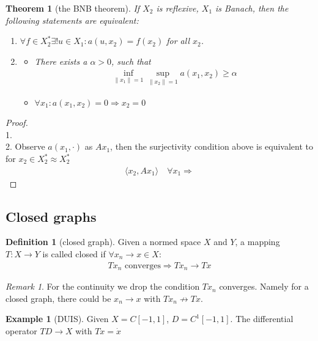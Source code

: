 \documentclass[a4paper,11pt,fleqn]{book}
\newtheorem{theorem}{Theorem}[section]
\theoremstyle{definition}
\newtheorem{definition}{Definition}[section]
\newtheorem*{example}{Example}
\theoremstyle{remark}
\newtheorem*{remark}{Remark}
\begin{document}
\begin{theorem}[the BNB theorem]
	If $X_2$ is reflexive, $X_1$ is Banach, then the following statements are equivalent:
	\begin{enumerate}
		\item $\forall f \in X^*_2 \exists ! u \in X_1: a(u, x_2) = f(x_2)$ for all $x_2$. 
		\item \begin{itemize}
			\item There exists a $\alpha > 0$, such that
			\begin{align*}
				\inf_{\|x_1\| = 1} \sup_{\|x_2\| = 1} a(x_1, x_2) \ge \alpha
			\end{align*}
			\item $\forall x_1: a(x_1, x_2) = 0 \Rightarrow x_2 = 0$
		\end{itemize}
	\end{enumerate}
\end{theorem}
\begin{proof}\quad\\
1. \\
2. Observe $a(x_1,  \cdot)$ as $Ax_1$, then the surjectivity condition above is equivalent to for $x_2 \in X_2^* \approx X_2^*$ 
\begin{align*}
	\langle x_2, Ax_1 \rangle \quad \forall x_1 \Rightarrow 
\end{align*}
\end{proof}




\subsection{Closed graphs}
\begin{definition}[closed graph]
	Given a normed space $X$ and $Y$, a mapping $T: X \rightarrow Y$ is called closed if $\forall x_n \rightarrow x \in X:$
	\begin{align*}
		 Tx_n \text{ converges} \Rightarrow Tx_n \rightarrow Tx
	\end{align*}
\end{definition}
\begin{remark}
For the continuity we drop the condition $Tx_n$ converges. Namely for a closed graph, there could be $x_n \rightarrow x$ with $Tx_n \nrightarrow Tx$. 	
\end{remark}

\begin{example}[DUIS]
	Given $X = C[-1, 1]$, $D = C^1[-1, 1]$. The differential operator $T D \rightarrow X$ with $Tx = \dot{x}$ 
\end{example}
\end{document}
